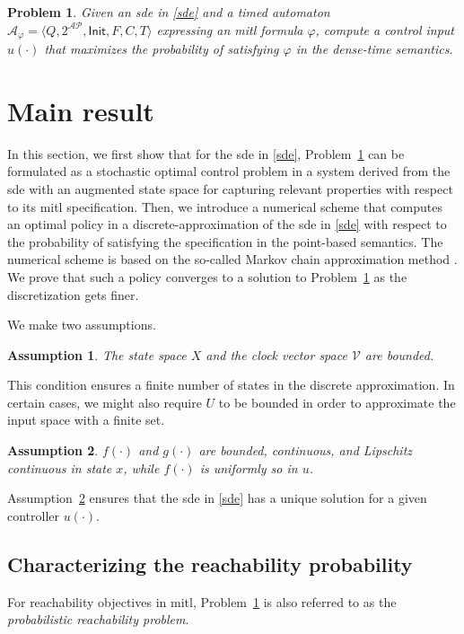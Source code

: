 \documentclass[letterpaper, 10 pt, conference]{ieeeconf}
\newtheorem{problem}{Problem}
\newtheorem{assumption}{Assumption}
\newcommand{\calA}{\mathcal{A}}
\newcommand{\calV}{\mathcal{V}}
\newcommand{\calAP}{\mathcal{AP}}
\newcommand{\init}{\mathsf{Init}}
\begin{document}
\begin{problem}
\label{problem}
Given an \ac{sde} in \eqref{sde} and a timed automaton
$\calA_\varphi=\langle Q, 2^{\calAP},\init, F, C, T \rangle$
expressing an \ac{mitl} formula $\varphi$, compute a control input
$u(\cdot)$ that maximizes the probability of satisfying $\varphi$ in
the dense-time semantics.
\end{problem}




\section{Main result}
In this section, we first show that for the \ac{sde} in \eqref{sde},
Problem~\ref{problem} can be formulated as a stochastic optimal
control problem in a system derived from the \ac{sde} with an
augmented state space for capturing relevant properties with respect
to its \ac{mitl} specification. Then, we introduce a numerical scheme
that computes an optimal policy in a discrete-approximation of the
\ac{sde} in \eqref{sde} with respect to the probability of satisfying
the specification in the point-based semantics. The numerical scheme
is based on the so-called Markov chain approximation method
\cite{kushner2001numerical}.  We prove that such a policy converges to
a solution to Problem~\ref{problem} as the discretization gets finer.


We make two assumptions.
\begin{assumption}
\label{assumption0}
  The state space $X$ and the clock vector space $\calV$ are bounded.
\end{assumption}
This condition ensures a finite number of states in the discrete
approximation. In certain cases, we might also require $U$ to be
bounded in order to approximate the input space with a finite set.


\begin{assumption}\label{assumption1}
  $f(\cdot)$ and $g(\cdot)$ are bounded, continuous, and Lipschitz
  continuous in state $x$, while $f(\cdot)$ is uniformly so in $u$.
\end{assumption}
Assumption~\ref{assumption1} ensures that the \ac{sde} in \eqref{sde}
has a unique solution for a given controller $u(\cdot)$.





\subsection{Characterizing the reachability probability}
For reachability objectives in \ac{mitl}, Problem~\ref{problem} is
also referred to as the \emph{probabilistic reachability problem}.
\end{document}
